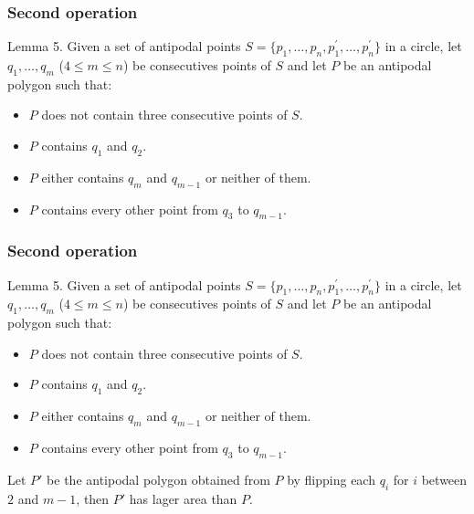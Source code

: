 \documentclass{beamer}
\begin{document}
\begin{frame}
\frametitle{Second operation}
\begin{alertblock}{Lemma 5.}
Given a set of antipodal points $S = \{p_{1},\dots,p_{n},p_{1}^{\prime},\dots,p_{n}^{\prime}\}$ in a circle, let $q_{1},\dots,q_{m}$ ($4\leq m\leq n$) be consecutives points of $S$ and let $P$ be an antipodal polygon such that:
\begin{itemize}
\item<2-> $P$ does not contain three consecutive points of $S$.
\item<3-> $P$ contains $q_{1}$ and $q_{2}$.
\item<4-> $P$ either contains $q_{m}$ and $q_{m-1}$ or neither of them.
\item<5-> $P$ contains every other point from $q_{3}$ to $q_{m-1}$.
\end{itemize}

\end{alertblock}

\end{frame}

\begin{frame}
\frametitle{Second operation}
\begin{alertblock}{Lemma 5.}
Given a set of antipodal points $S = \{p_{1},\dots,p_{n},p_{1}^{\prime},\dots,p_{n}^{\prime}\}$ in a circle, let $q_{1},\dots,q_{m}$ ($4\leq m\leq n$) be consecutives points of $S$ and let $P$ be an antipodal polygon such that:
\begin{itemize}
\item $P$ does not contain three consecutive points of $S$.
\item $P$ contains $q_{1}$ and $q_{2}$.
\item $P$ either contains $q_{m}$ and $q_{m-1}$ or neither of them.
\item $P$ contains every other point from $q_{3}$ to $q_{m-1}$.
\end{itemize}
\vspace{0.5cm}
Let $P'$ be the antipodal polygon obtained from $P$ by flipping each $q_{i}$ for $i$ between $2$ and $m-1$, then $P'$ has lager area than $P$.

\end{alertblock}

\end{frame}
\end{document}
